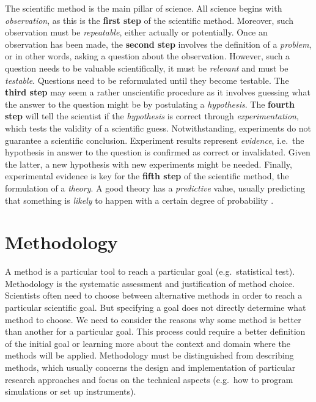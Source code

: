 \documentclass[
]{book}
\begin{document}
The scientific method is the main pillar of science. All science begins with \emph{observation}, as this is the \textbf{first step} of the scientific method. Moreover, such observation must be \emph{repeatable}, either actually or potentially. Once an observation has been made, the \textbf{second step} involves the definition of a \emph{problem}, or in other words, asking a question about the observation. However, such a question needs to be valuable scientifically, it must be \emph{relevant} and must be \emph{testable}. Questions need to be reformulated until they become testable. The \textbf{third step} may seem a rather unscientific procedure as it involves guessing what the answer to the question might be by postulating a \emph{hypothesis}. The \textbf{fourth step} will tell the scientist if the \emph{hypothesis} is correct through \emph{experimentation}, which tests the validity of a scientific guess. Notwithstanding, experiments do not guarantee a scientific conclusion. Experiment results represent \emph{evidence}, i.e.~the hypothesis in answer to the question is confirmed as correct or invalidated. Given the latter, a new hypothesis with new experiments might be needed. Finally, experimental evidence is key for the \textbf{fifth step} of the scientific method, the formulation of a \emph{theory}. A good theory has a \emph{predictive} value, usually predicting that something is \emph{likely} to happen with a certain degree of probability \citep{pos-nidditch}.

\hypertarget{methodology}{%
\section{Methodology}\label{methodology}}

A method is a particular tool to reach a particular goal (e.g.~statistical test). Methodology is the systematic assessment and justification of method choice. Scientists often need to choose between alternative methods in order to reach a particular scientific goal. But specifying a goal does not directly determine what method to choose. We need to consider the reasons why some method is better than another for a particular goal. This process could require a better definition of the initial goal or learning more about the context and domain where the methods will be applied. Methodology must be distinguished from describing methods, which usually concerns the design and implementation of particular research approaches and focus on the technical aspects (e.g.~how to program simulations or set up instruments).
\end{document}
